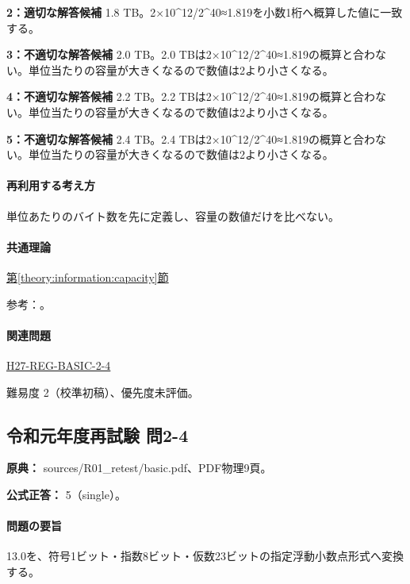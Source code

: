 \noindent\textbf{2：適切な解答候補} 1.8 TB。2×10\textasciicircum{}12/2\textasciicircum{}40≈1.819を小数1桁へ概算した値に一致する。\par

\noindent\textbf{3：不適切な解答候補} 2.0 TB。2.0 TBは2×10\textasciicircum{}12/2\textasciicircum{}40≈1.819の概算と合わない。単位当たりの容量が大きくなるので数値は2より小さくなる。\par

\noindent\textbf{4：不適切な解答候補} 2.2 TB。2.2 TBは2×10\textasciicircum{}12/2\textasciicircum{}40≈1.819の概算と合わない。単位当たりの容量が大きくなるので数値は2より小さくなる。\par

\noindent\textbf{5：不適切な解答候補} 2.4 TB。2.4 TBは2×10\textasciicircum{}12/2\textasciicircum{}40≈1.819の概算と合わない。単位当たりの容量が大きくなるので数値は2より小さくなる。\par

\paragraph{再利用する考え方} 単位あたりのバイト数を先に定義し、容量の数値だけを比べない。

\paragraph{共通理論} \hyperref[theory:information:capacity]{第\ref*{theory:information:capacity}節}

\par 参考：\cite{nist_binary_prefix}。

\paragraph{関連問題} \hyperref[q:h27-reg-basic-2-4]{H27-REG-BASIC-2-4}

\par 難易度 2（校準初稿）、優先度未評価。

\subsection{令和元年度再試験 問2-4}
\label{q:r01-ret-basic-2-4}

\noindent\textbf{原典：} sources/R01\_retest/basic.pdf、PDF物理9頁。

\textbf{公式正答：} 5（single）。

\paragraph{問題の要旨} 13.0を、符号1ビット・指数8ビット・仮数23ビットの指定浮動小数点形式へ変換する。

